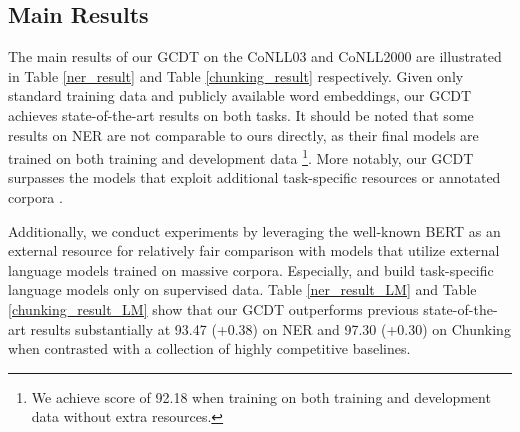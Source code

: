\documentclass[11pt,a4paper]{article}
\begin{document}
\subsection{Main Results}
The main results of our GCDT on the CoNLL03 and CoNLL2000 are illustrated in Table \ref{ner_result} and Table \ref{chunking_result} respectively. 
Given only standard training data and publicly available word embeddings, our GCDT achieves state-of-the-art results on both tasks. It should be noted that some results on NER are not comparable to ours directly, as their final models are trained on both training and development data \footnote{We achieve  score of 92.18 when training on both training and development data without extra resources.}. More notably, our GCDT surpasses the models that exploit additional task-specific resources or annotated corpora \cite{joint_Luo2015,Transfer_Yang2017,char-CNN+BLSTM}.

Additionally, we conduct experiments by leveraging the well-known BERT as an external resource for relatively fair comparison with models that utilize external language models trained on massive corpora.
Especially, \citeauthor{LM_no_annotation}  and   \citeauthor{LM_liu2017}  build task-specific language models only on supervised data.
Table \ref{ner_result_LM} and Table \ref{chunking_result_LM} show that our GCDT outperforms previous state-of-the-art results substantially at 93.47 (+0.38) on NER and 97.30 (+0.30) on Chunking when contrasted with a collection of highly competitive baselines.
\end{document}
